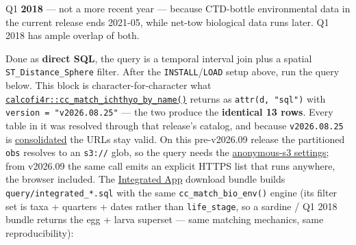 \documentclass[
  letterpaper,
  DIV=11,
  numbers=noendperiod]{scrreprt}
\begin{document}
\begin{tcolorbox}[enhanced jigsaw, arc=.35mm, colback=white, left=2mm, leftrule=.75mm, titlerule=0mm, bottomrule=.15mm, colbacktitle=quarto-callout-note-color!10!white, colframe=quarto-callout-note-color-frame, rightrule=.15mm, title=\textcolor{quarto-callout-note-color}{\faInfo}\hspace{0.5em}{Note}, breakable, opacityback=0, toptitle=1mm, toprule=.15mm, coltitle=black, bottomtitle=1mm, opacitybacktitle=0.6]

Q1 \textbf{2018} --- not a more recent year --- because CTD-bottle
environmental data in the current release ends 2021-05, while net-tow
biological data runs later. Q1 2018 has ample overlap of both.

\end{tcolorbox}

Done as \textbf{direct SQL}, the query is a temporal interval join plus
a spatial \texttt{ST\_Distance\_Sphere} filter. After the
\texttt{INSTALL}/\texttt{LOAD} setup above, run the query below. This
block is character-for-character what
\href{helpers.qmd}{\texttt{calcofi4r::cc\_match\_ichthyo\_by\_name()}}
returns as \texttt{attr(d,\ "sql")} with
\texttt{version\ =\ "v2026.08.25"} --- the two produce the
\textbf{identical 13 rows}. Every table in it was resolved through that
release's catalog, and because \texttt{v2026.08.25} is
\hyperref[sec-versions]{consolidated} the URLs stay valid. On this
pre-v2026.09 release the partitioned \texttt{obs} resolves to an
\texttt{s3://} glob, so the query needs the
\hyperref[hive-partitioned-tables]{anonymous-s3 settings}; from v2026.09
the same call emits an explicit HTTPS list that runs anywhere, the
browser included. The
\href{https://app.calcofi.io/db-viz-hex}{Integrated App} download bundle
builds \texttt{query/integrated\_*.sql} with the same
\texttt{cc\_match\_bio\_env()} engine (its filter set is taxa + quarters
+ dates rather than \texttt{life\_stage}, so a sardine / Q1 2018 bundle
returns the egg + larva superset --- same matching mechanics, same
reproducibility):
\end{document}
